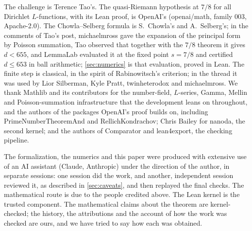 \documentclass[11pt]{article}
\theoremstyle{definition}
\begin{document}
The challenge is Terence Tao's. The quasi-Riemann hypothesis at $7/8$ for all Dirichlet $L$-functions, with its Lean proof, is OpenAI's (openai/math, family 003, Apache-2.0). The Chowla--Selberg formula is S.~Chowla's and A.~Selberg's; in the comments of Tao's post, michaelmross gave the expansion of the principal form by Poisson summation, Tao observed that together with the $7/8$ theorem it gives $d < 655$, and LemmaLab evaluated it at the fixed point $s = 7/8$ and certified $d \le 653$ in ball arithmetic; \cref{sec:numerics} is that evaluation, proved in Lean. The finite step is classical, in the spirit of Rabinowitsch's criterion; in the thread it was used by Lior Silberman, Kyle Pratt, twinheterodox and michaelmross. We thank Mathlib and its contributors for the number-field, $L$-series, Gamma, Mellin and Poisson-summation infrastructure that the development leans on throughout, and the authors of the packages OpenAI's proof builds on, including PrimeNumberTheoremAnd and RellichKondrachov; Chris Bailey for nanoda, the second kernel; and the authors of Comparator and lean4export, the checking pipeline.

The formalization, the numerics and this paper were produced with extensive use of an AI assistant (Claude, Anthropic) under the direction of the author, in separate sessions: one session did the work, and another, independent session reviewed it, as described in \cref{sec:caveats}, and then replayed the final checks. The mathematical route is due to the people credited above. The Lean kernel is the trusted component. The mathematical claims about the theorem are kernel-checked; the history, the attributions and the account of how the work was checked are ours, and we have tried to say how each was obtained.



\end{document}
